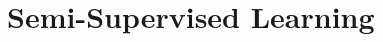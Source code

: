 \documentclass[manuscript,anonymous]{acmart}
\begin{document}
\maketitle

\section{Semi-Supervised Learning}



%
%
%
%
%
\end{document}
